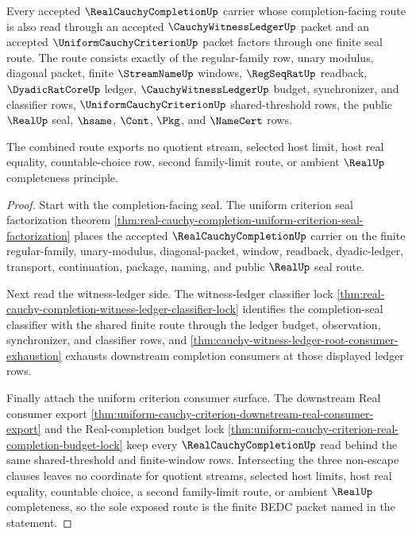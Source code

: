 \begin{theorem}
\label{thm:real-cauchy-completion-witness-ledger-uniform-seal-route}
Every accepted $\RealCauchyCompletionUp$ carrier whose completion-facing route is also read through an accepted $\CauchyWitnessLedgerUp$ packet and an accepted $\UniformCauchyCriterionUp$ packet factors through one finite seal route. The route consists exactly of the regular-family row, unary modulus, diagonal packet, finite $\StreamNameUp$ windows, $\RegSeqRatUp$ readback, $\DyadicRatCoreUp$ ledger, $\CauchyWitnessLedgerUp$ budget, synchronizer, and classifier rows, $\UniformCauchyCriterionUp$ shared-threshold rows, the public $\RealUp$ seal, $\hsame$, $\Cont$, $\Pkg$, and $\NameCert$ rows.

The combined route exports no quotient stream, selected host limit, host real equality, countable-choice row, second family-limit route, or ambient $\RealUp$ completeness principle.
\end{theorem}
\begin{proof}
Start with the completion-facing seal. The uniform criterion seal factorization theorem \autoref{thm:real-cauchy-completion-uniform-criterion-seal-factorization} places the accepted $\RealCauchyCompletionUp$ carrier on the finite regular-family, unary-modulus, diagonal-packet, window, readback, dyadic-ledger, transport, continuation, package, naming, and public $\RealUp$ seal route.

Next read the witness-ledger side. The witness-ledger classifier lock \autoref{thm:real-cauchy-completion-witness-ledger-classifier-lock} identifies the completion-seal classifier with the shared finite route through the ledger budget, observation, synchronizer, and classifier rows, and \autoref{thm:cauchy-witness-ledger-root-consumer-exhaustion} exhausts downstream completion consumers at those displayed ledger rows.

Finally attach the uniform criterion consumer surface. The downstream Real consumer export \autoref{thm:uniform-cauchy-criterion-downstream-real-consumer-export} and the Real-completion budget lock \autoref{thm:uniform-cauchy-criterion-real-completion-budget-lock} keep every $\RealCauchyCompletionUp$ read behind the same shared-threshold and finite-window rows. Intersecting the three non-escape clauses leaves no coordinate for quotient streams, selected host limits, host real equality, countable choice, a second family-limit route, or ambient $\RealUp$ completeness, so the sole exposed route is the finite BEDC packet named in the statement.
\end{proof}

